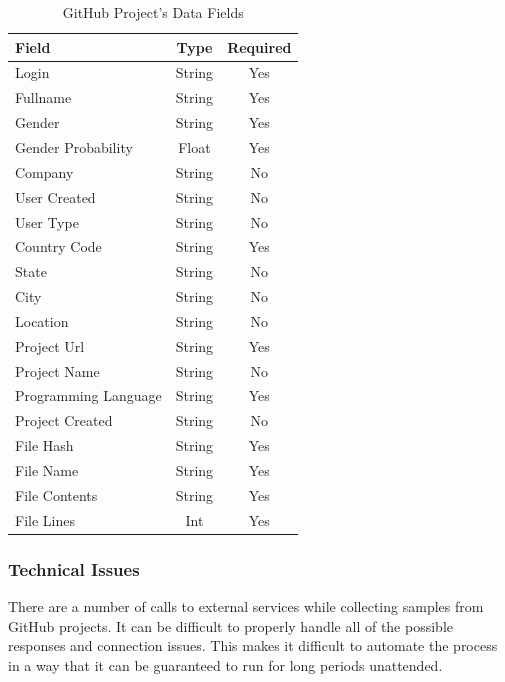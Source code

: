 \documentclass{article}
\begin{document}
\begin{table}[t]
    \begin{center}
        \caption{GitHub Project's Data Fields}
        \label{tab:git_data}
        \begin{tabular}{|l | c | c |}
            \hline
            \textbf{Field} & \textbf{Type} & \textbf{Required}\\
            \hline
            Login & String & Yes\\
            Fullname & String & Yes\\
            Gender & String & Yes\\
            Gender Probability & Float & Yes\\
            Company & String & No\\
            User Created & String & No\\
            User Type & String & No\\
            Country Code & String & Yes\\
            State & String & No\\
            City & String & No\\
            Location & String & No\\
            \hline
            Project Url & String & Yes\\
            Project Name & String & No\\
            Programming Language & String & Yes\\
            Project Created & String & No\\
            \hline
            File Hash & String & Yes\\
            File Name & String & Yes\\
            File Contents & String & Yes\\
            File Lines & Int & Yes\\
            \hline
        \end{tabular}
    \end{center}
\end{table}

\subsubsection*{Technical Issues}
There are a number of calls to external services while collecting samples from GitHub projects. It can be difficult to properly handle all of the possible responses and connection issues. This makes it difficult to automate the process in a way that it can be guaranteed to run for long periods unattended.
\end{document}
